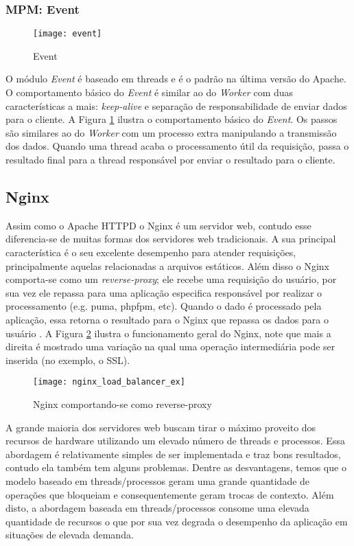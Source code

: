 \subsubsection{MPM: Event}

\begin{figure}[!h]
  \centering
  \texttt{[image: event]} 
  \caption{Event}
  \label{fig:event} 
\end{figure}

O módulo \textit{Event} é baseado em threads e é o padrão na última versão do
Apache. O comportamento básico do \textit{Event} é similar ao do
\textit{Worker} com duas características a mais: \textit{keep-alive} e
separação de responsabilidade de enviar dados para o cliente. A Figura
\ref{fig:event} ilustra o comportamento básico do \textit{Event}. Os passos são
similares ao do \textit{Worker} com um processo extra manipulando a transmissão
dos dados. Quando uma thread acaba o processamento útil da requisição, passa o
resultado final para a thread responsável por enviar o resultado para o
cliente.

\subsection{Nginx}

Assim como o Apache HTTPD o Nginx é um servidor web, contudo esse diferencia-se
de muitas formas dos servidores web tradicionais. A sua principal
característica é o seu excelente desempenho para atender requisições,
principalmente aquelas relacionadas a arquivos estáticos. Além disso o Nginx
comporta-se como um \textit{reverse-proxy}; ele recebe uma requisição do
usuário, por sua vez ele repassa para uma aplicação especifica responsável por
realizar o processamento (e.g. puma, phpfpm, etc). Quando o dado é processado
pela aplicação, essa retorna o resultado para o Nginx que repassa os dados para
o usuário \citep{soni}. A Figura \ref{fig:nginx_basico} ilustra o funcionamento
geral do Nginx, note que mais a direita é mostrado uma variação na qual uma
operação intermediária pode ser inserida (no exemplo, o SSL).

\begin{figure}[!h]
  \centering
  \texttt{[image: nginx\_load\_balancer\_ex]} 
  \caption{Nginx comportando-se como reverse-proxy \citep{soni}}
  \label{fig:nginx_basico} 
\end{figure}

A grande maioria dos servidores web buscam tirar o máximo proveito dos recursos
de hardware utilizando um elevado número de threads e processos. Essa abordagem
é relativamente simples de ser implementada e traz bons resultados, contudo ela
também tem alguns problemas. Dentre as desvantagens, temos que o modelo baseado
em threads/processos geram uma grande quantidade de operações que bloqueiam e
consequentemente geram trocas de contexto. Além disto, a abordagem baseada em
threads/processos consome uma elevada quantidade de recursos o que por sua vez
degrada o desempenho da aplicação em situações de elevada demanda.

